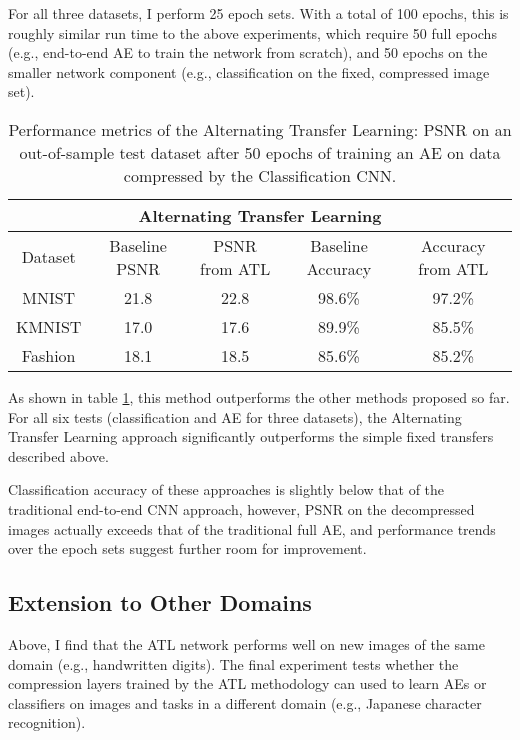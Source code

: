 \documentclass[twoside,11pt]{article}
\begin{document}
For all three datasets, I perform 25 epoch sets. With a total of 100 epochs, this is roughly
similar run time to the above experiments, which require 50 full epochs (e.g., end-to-end AE
to train the network from scratch), and 50 epochs on the smaller network component 
(e.g., classification on the fixed, compressed image set).


\begin{table}[h]
  \centering
  \begin{tabular}{|c||c|c|c|c|}
    \hline
    \multicolumn{5}{|c|}{Alternating Transfer Learning}\\
    \hline
    Dataset & Baseline PSNR  & PSNR from ATL & Baseline Accuracy & Accuracy from ATL \\   \hline
    MNIST & 21.8 & 22.8 & 98.6\% & 97.2\% \\   \hline
    KMNIST & 17.0 & 17.6 & 89.9\% & 85.5\% \\   \hline
    Fashion & 18.1 & 18.5 & 85.6\% & 85.2\% \\   \hline  

  \end{tabular}
  \caption{Performance metrics of the Alternating Transfer Learning:
   PSNR on an out-of-sample test dataset after 50 epochs of training an AE on
   data compressed by the Classification CNN.}
  \label{table:alternate}
\end{table}

As shown in table \ref{table:alternate}, this method outperforms the other methods proposed so far.
For all six tests (classification and AE for three datasets), the Alternating Transfer Learning 
approach significantly outperforms the simple fixed transfers described above. 

Classification accuracy of these approaches is slightly below that of the traditional 
end-to-end CNN approach, however, PSNR on the decompressed images actually exceeds that
of the traditional full AE, and performance trends over the epoch sets suggest further room
for improvement. 

\subsection{Extension to Other Domains}

Above, I find that the ATL network performs well on new images of the same domain (e.g., 
handwritten digits). The final experiment tests whether the compression layers trained
by the ATL methodology can used to learn AEs or classifiers on images and tasks in a 
different domain (e.g., Japanese character recognition).
\end{document}
